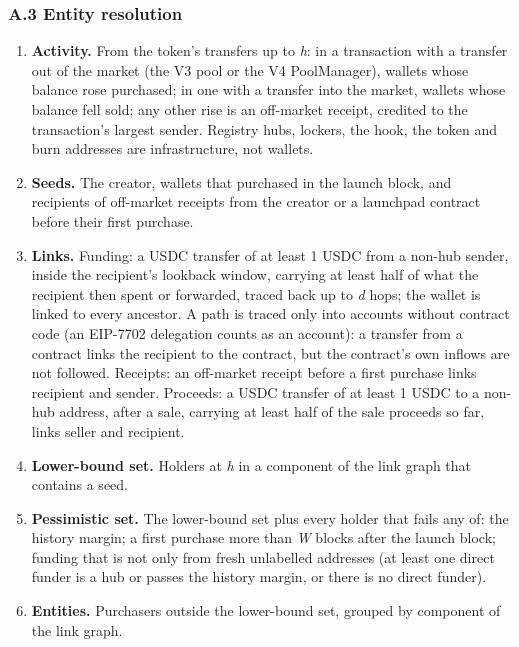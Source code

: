 \subsubsection{A.3 Entity resolution}\label{a.3-entity-resolution}

\begin{enumerate}
\def\labelenumi{\arabic{enumi}.}
\tightlist
\item
  \textbf{Activity.} From the token's transfers up to \emph{h}: in a transaction with a transfer out of the market (the V3 pool or the V4 PoolManager), wallets whose balance rose purchased; in one with a transfer into the market, wallets whose balance fell sold; any other rise is an off-market receipt, credited to the transaction's largest sender. Registry hubs, lockers, the hook, the token and burn addresses are infrastructure, not wallets.
\item
  \textbf{Seeds.} The creator, wallets that purchased in the launch block, and recipients of off-market receipts from the creator or a launchpad contract before their first purchase.
\item
  \textbf{Links.} Funding: a USDC transfer of at least 1 USDC from a non-hub sender, inside the recipient's lookback window, carrying at least half of what the recipient then spent or forwarded, traced back up to \emph{d} hops; the wallet is linked to every ancestor. A path is traced only into accounts without contract code (an EIP-7702 delegation counts as an account): a transfer from a contract links the recipient to the contract, but the contract's own inflows are not followed. Receipts: an off-market receipt before a first purchase links recipient and sender. Proceeds: a USDC transfer of at least 1 USDC to a non-hub address, after a sale, carrying at least half of the sale proceeds so far, links seller and recipient.
\item
  \textbf{Lower-bound set.} Holders at \emph{h} in a component of the link graph that contains a seed.
\item
  \textbf{Pessimistic set.} The lower-bound set plus every holder that fails any of: the history margin; a first purchase more than \emph{W} blocks after the launch block; funding that is not only from fresh unlabelled addresses (at least one direct funder is a hub or passes the history margin, or there is no direct funder).
\item
  \textbf{Entities.} Purchasers outside the lower-bound set, grouped by component of the link graph.
\end{enumerate}

